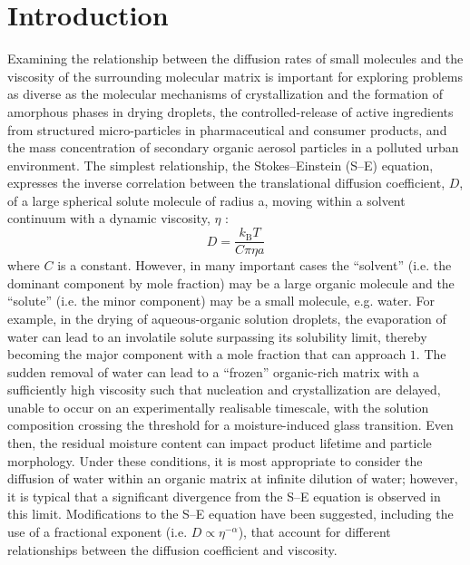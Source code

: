\section{Introduction}
Examining the relationship between the diffusion rates of small molecules and the viscosity of the surrounding molecular matrix is important for exploring problems as diverse as the molecular mechanisms of crystallization and the formation of amorphous phases in drying droplets\cite{Nascimento2010,Mikhailov2009a,Koop2011}, the controlled-release of active ingredients from structured micro-particles in pharmaceutical and consumer products\cite{hidy1984aerosols,Hancock1997,Lorenz2011,Haddrell2014}, and the mass concentration of secondary organic aerosol particles in a polluted urban environment\cite{Shiraiwa2012a,mai2015under,Maclean2017}. The simplest relationship, the Stokes–Einstein (S–E) equation, expresses the inverse correlation between the translational diffusion coefficient, $D$, of a large spherical solute molecule of radius a, moving within a solvent continuum with a dynamic viscosity, $\eta$ \cite{powerTransitionLiquidSolidlike2013,chenStokesEinsteinRelationSupercooled2006}:
\begin{equation}\label{eqn:diffusion}
D=\frac{k_{\mathrm{B}} T}{C \pi \eta a}
\end{equation}
where $C$ is a constant. However, in many important cases the ``solvent” (i.e. the dominant component by mole fraction) may be a large organic molecule and the ``solute” (i.e. the minor component) may be a small molecule, e.g. water\cite{powerTransitionLiquidSolidlike2013,Price2014,Molinero2005}. For example, in the drying of aqueous-organic solution droplets, the evaporation of water can lead to an involatile solute surpassing its solubility limit, thereby becoming the major component with a mole fraction that can approach $1$. The sudden removal of water can lead to a ``frozen'' organic-rich matrix with a sufficiently high viscosity such that nucleation and crystallization are delayed, unable to occur on an experimentally realisable timescale, with the solution composition crossing the threshold for a moisture-induced glass transition.\cite{Bones2012} Even then, the residual moisture content can impact product lifetime and particle morphology. Under these conditions, it is most appropriate to consider the diffusion of water within an organic matrix at infinite dilution of water; however, it is typical that a significant divergence from the S–E equation is observed in this limit\cite{powerTransitionLiquidSolidlike2013,Price2015,Chenyakin2017}. Modifications to the S–E equation have been suggested, including the use of a fractional exponent (i.e. $D \propto \eta^{-\alpha}$), that account for different relationships between the diffusion coefficient and viscosity\cite{Harris2009,price2016sucrose, Fernandez-Alonso2007}.

